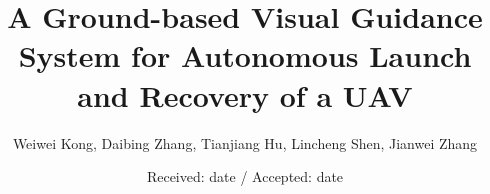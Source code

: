 \title{A Ground-based Visual Guidance System for Autonomous Launch and Recovery of a UAV}


\author{Weiwei Kong, Daibing Zhang, Tianjiang Hu, Lincheng Shen, Jianwei Zhang %
}



\date{Received: date / Accepted: date}


\maketitle

